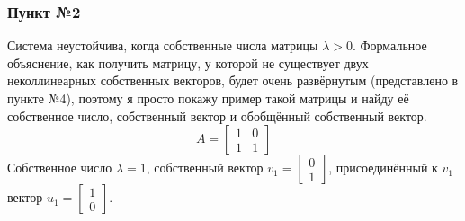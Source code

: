 \documentclass[a3paper,14pt]{extarticle}
\begin{document}
\subsubsection*{Пункт №2}
Система неустойчива, когда собственные числа матрицы $\lambda > 0$. Формальное объяснение, как получить матрицу, у которой не существует двух неколлинеарных собственных векторов, будет очень развёрнутым (представлено в пункте №4), поэтому я просто покажу пример такой матрицы и найду её собственное число, собственный вектор и обобщённый собственный вектор.
$$A = \begin{bmatrix}
    1 & 0 \\ 1 & 1
\end{bmatrix}$$
Собственное число $\lambda = 1$, собственный вектор $v_1 = \left[\begin{smallmatrix}
    0 \\ 1
\end{smallmatrix}\right]$, присоединённый к $v_1$ вектор $u_1 = \left[\begin{smallmatrix}
    1 \\ 0
\end{smallmatrix}\right]$.
\end{document}
